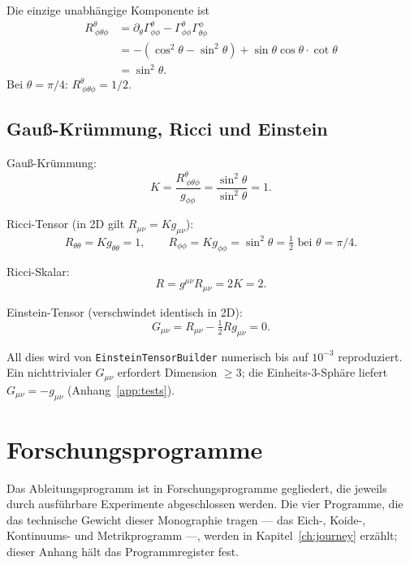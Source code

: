 \documentclass[10pt,twoside,openany]{book}
\begin{document}
Die einzige unabhängige Komponente ist
\begin{align}
R^\theta_{\ \phi\theta\phi}
&= \partial_\theta\Gamma^\theta_{\phi\phi} - \Gamma^\theta_{\phi\phi}\Gamma^\phi_{\theta\phi} \\
&= -\left(\cos^2\theta-\sin^2\theta\right) + \sin\theta\cos\theta\cdot\cot\theta \\
&= \sin^2\theta.
\end{align}
Bei $\theta=\pi/4$: $R^\theta_{\ \phi\theta\phi}=1/2$.

\section{Gauß-Krümmung, Ricci und Einstein}

Gauß-Krümmung:
\begin{equation}
K = \frac{R^\theta_{\ \phi\theta\phi}}{g_{\phi\phi}}
= \frac{\sin^2\theta}{\sin^2\theta} = 1.
\end{equation}

Ricci-Tensor (in 2D gilt $R_{\mu\nu}=K g_{\mu\nu}$):
\begin{equation}
R_{\theta\theta}=K g_{\theta\theta}=1,\qquad
R_{\phi\phi}=K g_{\phi\phi}=\sin^2\theta=\tfrac12 \text{ bei }\theta=\pi/4.
\end{equation}

Ricci-Skalar:
\begin{equation}
R = g^{\mu\nu}R_{\mu\nu} = 2K = 2.
\end{equation}

Einstein-Tensor (verschwindet identisch in 2D):
\begin{equation}
G_{\mu\nu} = R_{\mu\nu} - \tfrac12 R g_{\mu\nu} = 0.
\end{equation}

All dies wird von \texttt{EinsteinTensorBuilder} numerisch bis auf $10^{-3}$ reproduziert.
Ein nichttrivialer $G_{\mu\nu}$ erfordert Dimension $\ge3$; die Einheits-3-Sphäre liefert
$G_{\mu\nu}=-g_{\mu\nu}$ (Anhang~\ref{app:tests}).


\chapter{Forschungsprogramme}
\label{app:programs}

Das Ableitungsprogramm ist in Forschungsprogramme gegliedert, die jeweils durch
ausführbare Experimente abgeschlossen werden. Die vier Programme, die das technische
Gewicht dieser Monographie tragen --- das Eich-, Koide-, Kontinuums- und Metrikprogramm
---, werden in Kapitel~\ref{ch:journey} erzählt; dieser Anhang hält das
Programmregister fest.
\end{document}
